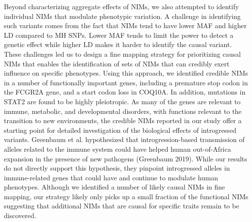 Beyond characterizing aggregate effects of NIMs, we also attempted to identify individual NIMs that modulate phenotypic variation. A challenge in identifying such variants comes from the fact that NIMs tend to have lower MAF and higher LD compared to MH SNPs. Lower MAF tends to limit the power to detect a genetic effect while higher LD makes it harder to identify the causal variant. These challenges led us to design a fine mapping strategy for prioritizing causal NIMs that enables the identification of sets of NIMs that can credibly exert influence on specific phenotypes. Using this approach, we identified credible NIMs in a number of functionally important genes, including a premature stop codon in the FCGR2A gene, and a start codon loss in COQ10A. In addition, mutations in STAT2 are found to be highly pleiotropic. As many of the genes are relevant to immune, metabolic, and developmental disorders, with functions relevant to the transition to new environments, the credible NIMs reported in our study offer a starting point for detailed investigation of the biological effects of introgressed variants. Greenbaum et al. hypothesized that introgression-based transmission of alleles related to the immune system could have helped human out-of-Africa expansion in the presence of new pathogens (Greenbaum 2019). While our results do not directly support this hypothesis, they pinpoint introgressed alleles in immune-related genes that could have and continue to modulate human phenotypes. Although we identified a number of likely causal NIMs in fine mapping, our strategy likely only picks up a small fraction of the functional NIMs suggesting that additional NIMs that are causal for specific traits remain to be discovered. 

